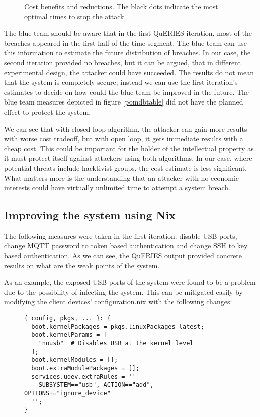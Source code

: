 \begin{figure}[t!]
\centerline{}
\caption[Cost benefits of applied economic model.]{Cost benefits and reductions. The black dots indicate the
  most optimal times to stop the attack.}
\label{openandclosed}
\end{figure}

The blue team should be aware that in the first QuERIES iteration,
most of the breaches appeared in the first half of the time
segment. The blue team can use this information to estimate the future
distribution of breaches. In our case, the second iteration provided
no breaches, but it can be argued, that in different experimental
design, the attacker could have succeeded. The results do not mean that
the system is completely secure; instead we can use the first
iteration's estimates to decide on how could the blue team be improved
in the future. The blue team measures depicted in figure
\ref{pomdbtable} did not have the planned effect to protect the system.

We can see that with closed loop algorithm, the attacker can gain more
results with worse cost tradeoff, but with open loop, it gets
immediate results with a cheap cost. This could be important for the
holder of the intellectual property as it must protect itself against
attackers using both algorithms. In our case, where potential threats
include hacktivist groups, the cost estimate is less significant. What
matters more is the understanding that an attacker with no economic
interests could have virtually unlimited time to attempt a system
breach.

\subsection{Improving the system using Nix}\label{improvingwithnix}

The following measures were taken in the first iteration: disable USB
ports, change MQTT password to token based authentication and change
SSH to key based authentication. As we can see, the QuERIES output
provided concrete results on what are the weak points of the system.

As an example, the exposed USB-ports of the system were found to be a
problem due to the possibility of infecting the system. This can be mitigated easily by modifying the
client devices' configuration.nix with the following changes:

\begin{figure}[H]
\begin{lstlisting} 
{ config, pkgs, ... }: {
  boot.kernelPackages = pkgs.linuxPackages_latest;
  boot.kernelParams = [
    "nousb"  # Disables USB at the kernel level
  ];
  boot.kernelModules = [];
  boot.extraModulePackages = [];
  services.udev.extraRules = ''
    SUBSYSTEM=="usb", ACTION=="add", OPTIONS+="ignore_device"
  '';
}
\end{lstlisting}
\label{kernelsnippet}
\end{figure}


